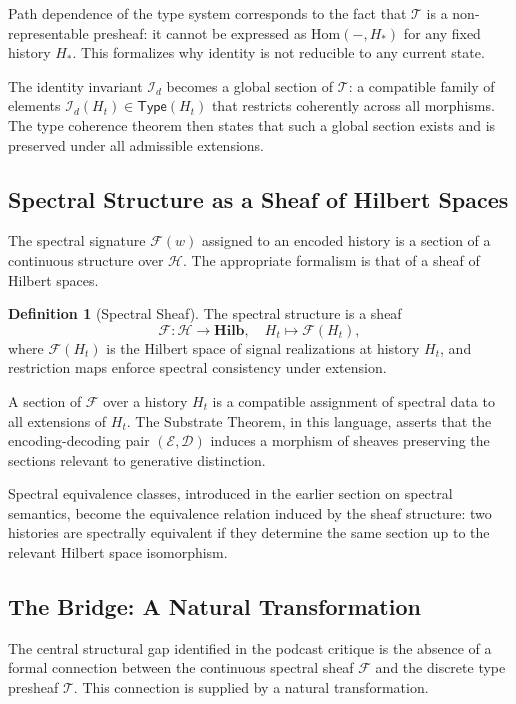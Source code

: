 \documentclass[12pt, a4paper]{article}
\theoremstyle{plain}
\theoremstyle{definition}
\newtheorem{definition}[theorem]{Definition}
\theoremstyle{remark}
\begin{document}
Path dependence of the type system corresponds to the fact that $\mathcal{T}$ is a non-representable presheaf: it cannot be expressed as $\mathrm{Hom}(-, H_*)$ for any fixed history $H_*$. This formalizes why identity is not reducible to any current state.

The identity invariant $\mathcal{I}_d$ becomes a global section of $\mathcal{T}$: a compatible family of elements $\mathcal{I}_d(H_t) \in \mathsf{Type}(H_t)$ that restricts coherently across all morphisms. The type coherence theorem then states that such a global section exists and is preserved under all admissible extensions.

\subsection{Spectral Structure as a Sheaf of Hilbert Spaces}

The spectral signature $\mathcal{F}(w)$ assigned to an encoded history is a section of a continuous structure over $\mathcal{H}$. The appropriate formalism is that of a sheaf of Hilbert spaces.

\begin{definition}[Spectral Sheaf]
The spectral structure is a sheaf
\[
\mathcal{F} : \mathcal{H} \to \mathbf{Hilb},
\quad H_t \mapsto \mathcal{F}(H_t),
\]
where $\mathcal{F}(H_t)$ is the Hilbert space of signal realizations at history $H_t$, and restriction maps enforce spectral consistency under extension.
\end{definition}

A section of $\mathcal{F}$ over a history $H_t$ is a compatible assignment of spectral data to all extensions of $H_t$. The Substrate Theorem, in this language, asserts that the encoding-decoding pair $(\mathcal{E}, \mathcal{D})$ induces a morphism of sheaves preserving the sections relevant to generative distinction.

Spectral equivalence classes, introduced in the earlier section on spectral semantics, become the equivalence relation induced by the sheaf structure: two histories are spectrally equivalent if they determine the same section up to the relevant Hilbert space isomorphism.

\subsection{The Bridge: A Natural Transformation}

The central structural gap identified in the podcast critique is the absence of a formal connection between the continuous spectral sheaf $\mathcal{F}$ and the discrete type presheaf $\mathcal{T}$. This connection is supplied by a natural transformation.
\end{document}
